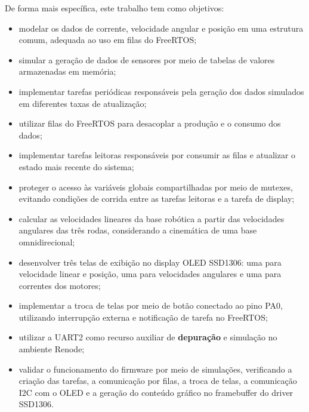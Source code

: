 \documentclass[a4paper,10pt]{article}
\begin{document}
De forma mais específica, este trabalho tem como objetivos:

\begin{itemize}
    \item modelar os dados de corrente, velocidade angular e posição em uma estrutura comum, adequada ao uso em filas do FreeRTOS;

    \item simular a geração de dados de sensores por meio de tabelas de valores armazenadas em memória;

    \item implementar tarefas periódicas responsáveis pela geração dos dados simulados em diferentes taxas de atualização;

    \item utilizar filas do FreeRTOS para desacoplar a produção e o consumo dos dados;

    \item implementar tarefas leitoras responsáveis por consumir as filas e atualizar o estado mais recente do sistema;

    \item proteger o acesso às variáveis globais compartilhadas por meio de mutexes, evitando condições de corrida entre as tarefas leitoras e a tarefa de display;

    \item calcular as velocidades lineares da base robótica a partir das velocidades angulares das três rodas, considerando a cinemática de uma base omnidirecional;

    \item desenvolver três telas de exibição no display OLED SSD1306: uma para velocidade linear e posição, uma para velocidades angulares e uma para correntes dos motores;

    \item implementar a troca de telas por meio de botão conectado ao pino PA0, utilizando interrupção externa e notificação de tarefa no FreeRTOS;

    \item utilizar a UART2 como recurso auxiliar de \textbf{depuração} e simulação no ambiente Renode;

    \item validar o funcionamento do firmware por meio de simulações, verificando a criação das tarefas, a comunicação por filas, a troca de telas, a comunicação I2C com o OLED e a geração do conteúdo gráfico no framebuffer do driver SSD1306.
\end{itemize}
\end{document}
